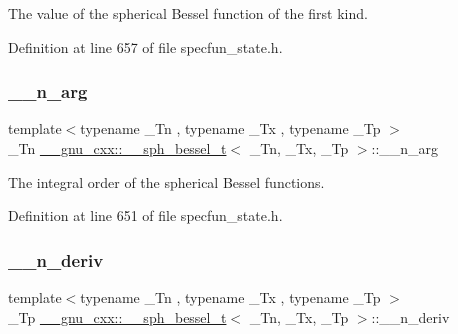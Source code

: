 The value of the spherical Bessel function of the first kind. 



Definition at line 657 of file specfun\+\_\+state.\+h.

\mbox{\label{struct____gnu__cxx_1_1____sph__bessel__t_a002325ca0f884fb872e1d211e7885d58}} 
\subsubsection{\texorpdfstring{\+\_\+\+\_\+n\+\_\+arg}{\_\_n\_arg}}
{\footnotesize\ttfamily template$<$typename \+\_\+\+Tn , typename \+\_\+\+Tx , typename \+\_\+\+Tp $>$ \\
\+\_\+\+Tn \hyperlink{struct____gnu__cxx_1_1____sph__bessel__t}{\+\_\+\+\_\+gnu\+\_\+cxx\+::\+\_\+\+\_\+sph\+\_\+bessel\+\_\+t}$<$ \+\_\+\+Tn, \+\_\+\+Tx, \+\_\+\+Tp $>$\+::\+\_\+\+\_\+n\+\_\+arg}



The integral order of the spherical Bessel functions. 



Definition at line 651 of file specfun\+\_\+state.\+h.

\mbox{\label{struct____gnu__cxx_1_1____sph__bessel__t_a84247b0cc2295f300c523d85a3cc601f}} 
\subsubsection{\texorpdfstring{\+\_\+\+\_\+n\+\_\+deriv}{\_\_n\_deriv}}
{\footnotesize\ttfamily template$<$typename \+\_\+\+Tn , typename \+\_\+\+Tx , typename \+\_\+\+Tp $>$ \\
\+\_\+\+Tp \hyperlink{struct____gnu__cxx_1_1____sph__bessel__t}{\+\_\+\+\_\+gnu\+\_\+cxx\+::\+\_\+\+\_\+sph\+\_\+bessel\+\_\+t}$<$ \+\_\+\+Tn, \+\_\+\+Tx, \+\_\+\+Tp $>$\+::\+\_\+\+\_\+n\+\_\+deriv}



